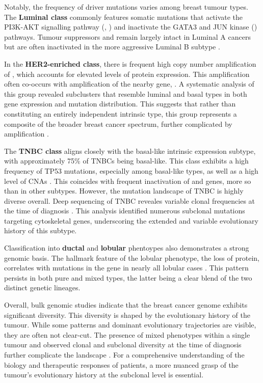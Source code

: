 Notably, the frequency of driver mutations varies among breast tumour types. The \textbf{Luminal class} commonly features somatic mutations that activate the PI3K-AKT signalling pathway (, ) and inactivate the GATA3 and JUN kinase () pathways. Tumour suppressors  and  remain largely intact in Luminal A cancers but are often inactivated in the more aggressive Luminal B subtype \parencite{Cancer_Genome_Atlas_Network2012-gx}.

In the \textbf{HER2-enriched class}, there is frequent high copy number amplification of , which accounts for elevated levels of  protein expression. This amplification often co-occurs with amplification of the nearby gene, . A systematic analysis of this group revealed subclusters that resemble luminal and basal types in both gene expression and mutation distribution. This suggests that rather than constituting an entirely independent intrinsic type, this group represents a composite of the broader breast cancer spectrum, further complicated by  amplification \parencite{Ferrari2016-qj}.

The \textbf{\ac{TNBC} class} aligns closely with the basal-like intrinsic expression subtype, with approximately 75\% of \ac{TNBC}s being basal-like. This class exhibits a high frequency of TP53 mutations, especially among basal-like types, as well as a high level of \ac{CNA}s \parencite{Shah2012-xz, Cancer_Genome_Atlas_Network2012-gx}. This coincides with frequent inactivation of  and  genes, more so than in other subtypes. However, the mutation landscape of \ac{TNBC} is highly diverse overall. Deep sequencing of \ac{TNBC} reveales variable clonal frequencies at the time of diagnosis \parencite{Shah2012-xz}. This analysis identified numerous subclonal mutations targeting cytoskeletal genes, underscoring the extended and variable evolutionary history of this subtype.

Classification into \textbf{ductal} and \textbf{lobular} phentoypes also demonstrates a strong genomic basis. The hallmark feature of the lobular phenotype, the loss of  protein, correlates with mutations in the  gene in nearly all lobular cases \parencite{Ciriello2015-ey}. This pattern persists in both pure and mixed types, the latter being a clear blend of the two distinct genetic lineages.

Overall, bulk genomic studies indicate that the breast cancer genome exhibits significant diversity. This diversity is shaped by the evolutionary history of the tumour. While some patterns and dominant evolutionary trajectories are visible, they are often not clear-cut. The presence of mixed phenotypes within a single tumour and observed clonal and subclonal diversity at the time of diagnosis further complicate the landscape \parencite{Ciriello2015-ey,Pereira2016-ov,Shah2012-xz}. For a comprehensive understanding of the biology and therapeutic responses of patients, a more nuanced grasp of the tumour's evolutionary history at the subclonal level is essential.

